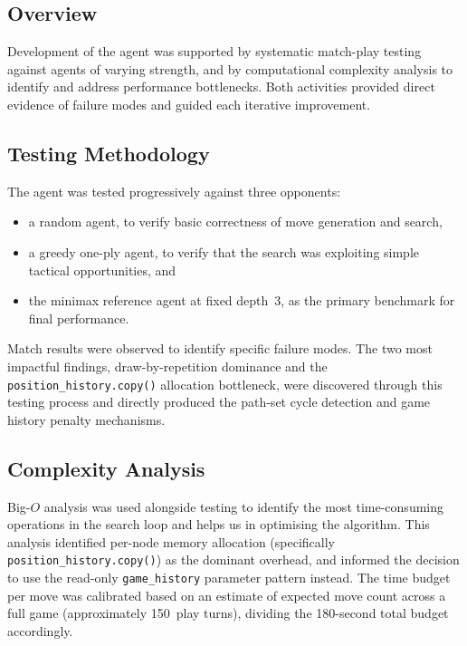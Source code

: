 \documentclass[10.5pt,a4paper]{article}
\begin{document}
\subsection{Overview}

Development of the agent was supported by systematic match-play testing against agents of varying strength, and by computational complexity analysis to identify and address performance bottlenecks. Both activities provided direct evidence of failure modes and guided each iterative improvement.

\subsection{Testing Methodology}

The agent was tested progressively against three opponents:

\begin{itemize}[noitemsep]
    \item a random agent, to verify basic correctness of move generation and search,
    \item a greedy one-ply agent, to verify that the search was exploiting simple tactical opportunities, and
    \item the minimax reference agent at fixed depth~3, as the primary benchmark for final performance.
\end{itemize}

Match results were observed to identify specific failure modes. The two most impactful findings, draw-by-repetition dominance and the \texttt{position\_history.copy()} allocation bottleneck, were discovered through this testing process and directly produced the path-set cycle detection and game history penalty mechanisms.

\subsection{Complexity Analysis}

Big-$O$ analysis was used alongside testing to identify the most time-consuming operations in the search loop and helps us in optimising the algorithm. This analysis identified per-node memory allocation (specifically \texttt{position\_history.copy()}) as the dominant overhead, and informed the decision to use the read-only \texttt{game\_history} parameter pattern instead. The time budget per move was calibrated based on an estimate of expected move count across a full game (approximately 150~play turns), dividing the 180-second total budget accordingly.
\end{document}
